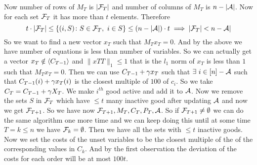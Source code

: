 \documentclass[a4paper, 11pt]{article}
\begin{document}
{	 Now number of rows of $M_T$ is $|\mathcal{F}_T|$ and number of columns of $M_T$ is $n-|\mathcal{A}|$. Now for each set $\mathcal{F}_T$ it has more than $t$ elements. Therefore $$t\cdot |\mathcal{F}_T|\leq \{(i,S)\colon S\in\mathcal{F}_T,\ i\in S\}\leq (n-|\mathcal{A}|)\cdot t\implies|\mathcal{F}_T|<n-\mathcal{A}|$$So we want to find a new vector $x_T$ such that $M_Tx_T=0$. And by the above we have number of equations is less than number of variables. So we can actually get a vector $x_T\notin \langle C_{T-1}\rangle$ and $\|xTT\|_1\leq 1$ that is the $l_1$ norm of $x_T$ is less than $1$ such that $M_Tx_T=0$. Then we can use $C_{T-1}+\gamma x_T$ such that $\exists\ i\in [n]-\mathcal{A}$ such that $C_{T-1}(i)+\gamma x_T(i)$ is the closest multiple of $100$ of $c_i$. So we take $C_T=C_{T-1}+\gamma X_T$. We make $i^{th}$ good active and add it to $\mathcal{A}$. Now we remove the sets $S$ in $\mathcal{F}_T$ which have $\leq t$ many inactive good after updating $\mathcal{A}$ and now we get $\mathcal{F}_{T+1}$. So we have now $\mathcal{F}_{T+1},M_T, C_T,P_T,\mathcal{A}$.  So if $\mathcal{F}_{T+1}\neq \emptyset$ we can do the same algorithm one more time and we can keep doing this until at some time $T=k\leq n$ we have $\mathcal{F}_k=\emptyset$. Then we have all the sets with $\leq t$ inactive goods. Now we set the costs of the unset variables to be the closest multiple of the of the corresponding values in $C_k$.  And by the first observation the deviation of the costs for each order will be at most $100t$.
}
\end{document}
